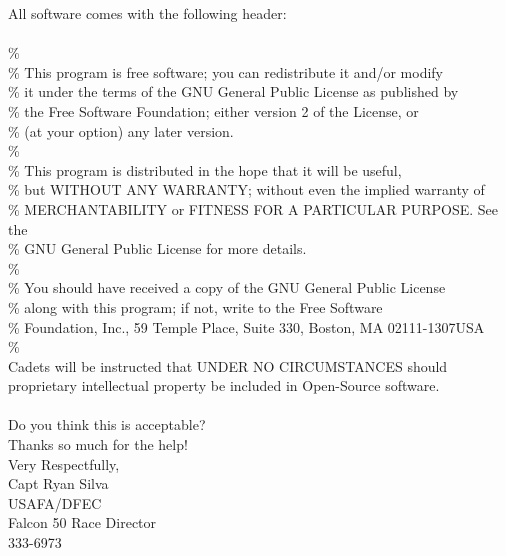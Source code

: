 \documentclass[10pt]{article}
\begin{document}
\newpage
\noindent All software comes with the following header: \\
 \\
\% \\
\%    This program is free software; you can redistribute it and/or modify \\
\%    it under the terms of the GNU General Public License as published by \\
\%    the Free Software Foundation; either version 2 of the License, or \\
\%    (at your option) any later version. \\
\% \\
\%    This program is distributed in the hope that it will be useful, \\
\%    but WITHOUT ANY WARRANTY; without even the implied warranty of \\
\%    MERCHANTABILITY or FITNESS FOR A PARTICULAR PURPOSE.  See the \\
\%    GNU General Public License for more details. \\
\% \\
\%    You should have received a copy of the GNU General Public License \\
\%    along with this program; if not, write to the Free Software \\
\%    Foundation, Inc., 59 Temple Place, Suite 330, Boston, MA  02111-1307USA \\
\%  \\

\noindent Cadets will be instructed that UNDER NO CIRCUMSTANCES should proprietary intellectual property be included in Open-Source software. \\
\hspace{0pt} \\
\noindent Do you think this is acceptable? \\

\noindent Thanks so much for the help! \\

\noindent Very Respectfully, \\
Capt Ryan Silva \\
USAFA/DFEC \\
Falcon 50 Race Director \\
333-6973 \\
\end{document}

